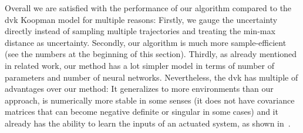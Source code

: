 		Overall we are satisfied with the performance of our algorithm compared to the \ac{dvk} Koopman model for multiple reasons: Firstly, we gauge the uncertainty directly instead of sampling multiple trajectories and treating the min-max distance as uncertainty. Secondly, our algorithm is much more sample-efficient (see the numbers at the beginning of this section). Thirdly, as already mentioned in related work, our method has a lot simpler model in terms of number of parameters and number of neural networks. Nevertheless, the \ac{dvk} has multiple of advantages over our method: It generalizes to more environments than our approach, is numerically more stable in some senses (\eg it does not have covariance matrices that can become negative definite or singular in some cases) and it already has the ability to learn the inputs of an actuated system, as shown in~\cite{mortonDeepVariationalKoopman2019a}.


